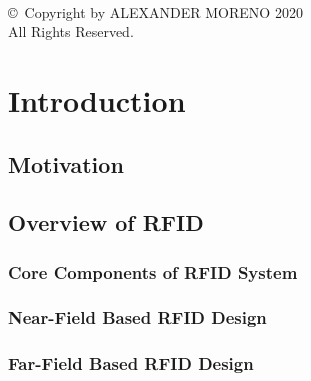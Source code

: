 \documentclass[12pt,onecolumn]{report}
\begin{document}
\newpage
\centering
\clearpage
~ \\
\vfill
\copyright~Copyright by ALEXANDER MORENO 2020 \\
All Rights Reserved.


\pagebreak
\justify
{}
\setcounter{page}{3}
\renewcommand{\contentsname}{Table of Contents}


\tableofcontents
\listoffigures

\newpage
\begin{abstract}
\thispagestyle{plain}
\setcounter{page}{9}
\end{abstract}

\clearpage
{}
\doublespacing
\chapter{Introduction}
    \section{Motivation}
        
    \section{Overview of RFID}
        \subsection{Core Components of RFID System}
            
        \subsection{Near-Field Based RFID Design}
            
        \subsection{Far-Field Based RFID Design}
            
\end{document}
